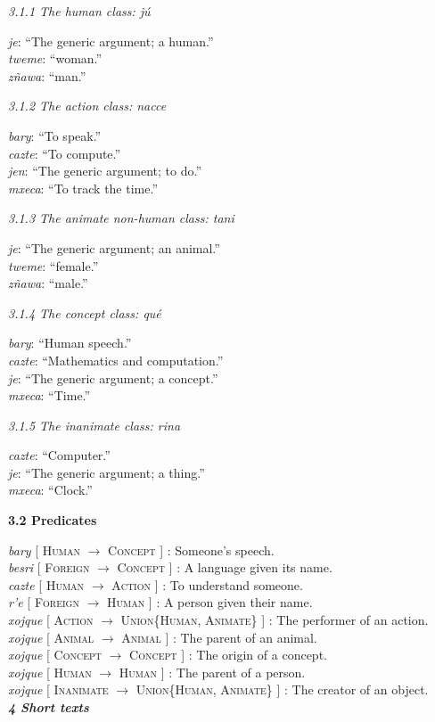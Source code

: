 \documentclass{article}[10pt]
\newcommand{\define}[4]{\emph{#1} [ \textsc{#2} $\rightarrow$ \textsc{#3} ] : #4. \\}
\newcommand{\defarg}[2]{\emph{#1}: ``#2.''\\}
\begin{document}
\emph{3.1.1 The human class: \emph{j\'{u}}}
\begin{multicols}{3}
\noindent
\defarg{je}{The generic argument; a human}
\defarg{tweme}{woman}
\defarg{z\~{n}awa}{man}
\end{multicols}

\emph{3.1.2 The action class: \emph{nacce}}
\begin{multicols}{3}
\noindent
\defarg{bary}{To speak}
\defarg{cazte}{To compute}
\defarg{jen}{The generic argument; to do}
\defarg{mxeca}{To track the time}
\end{multicols}

\emph{3.1.3 The animate non-human class: \emph{tani}}
\begin{multicols}{3}
\noindent
\defarg{je}{The generic argument; an animal}
\defarg{tweme}{female}
\defarg{z\~{n}awa}{male}
\end{multicols}

\emph{3.1.4 The concept class: \emph{qu\'{e}}}
\begin{multicols}{3}
\noindent
\defarg{bary}{Human speech}
\defarg{cazte}{Mathematics and computation}
\defarg{je}{The generic argument; a concept}
\defarg{mxeca}{Time}
\end{multicols}

\emph{3.1.5 The inanimate class: \emph{rina}}
\begin{multicols}{3}
\noindent
\defarg{cazte}{Computer}
\defarg{je}{The generic argument; a thing}
\defarg{mxeca}{Clock}
\end{multicols}

{\bf 3.2 Predicates}

\noindent
\define{bary}{Human}{Concept}{Someone's speech}
\define{besri}{Foreign}{Concept}{A language given its name}
\define{cazte}{Human}{Action}{To understand someone}
\define{r'e}{Foreign}{Human}{A person given their name}
\define{xojque}{Action}{Union\{Human, Animate\}}{The performer of an action}
\define{xojque}{Animal}{Animal}{The parent of an animal}
\define{xojque}{Concept}{Concept}{The origin of a concept}
\define{xojque}{Human}{Human}{The parent of a person}
\define{xojque}{Inanimate}{Union\{Human, Animate\}}{The creator of an object}

\clearpage
{\bf \emph{4 Short texts}}\\
\end{document}

